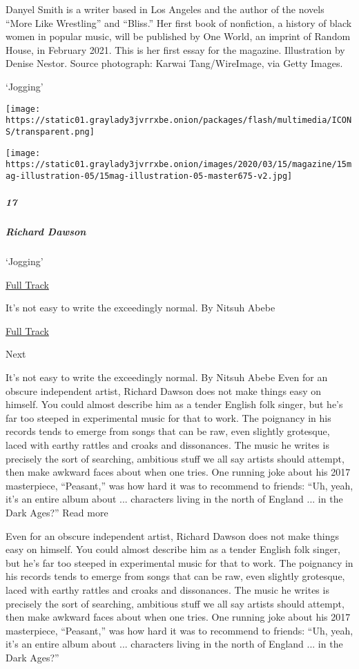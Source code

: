 Danyel Smith is a writer based in Los Angeles and the author of the
novels ``More Like Wrestling'' and ``Bliss.'' Her first book of
nonfiction, a history of black women in popular music, will be published
by One World, an imprint of Random House, in February 2021. This is her
first essay for the magazine. Illustration by Denise Nestor. Source
photograph: Karwai Tang/WireImage, via Getty Images.

`Jogging'

\texttt{[image: https://static01.graylady3jvrrxbe.onion/packages/flash/multimedia/ICONS/transparent.png]}

\texttt{[image: https://static01.graylady3jvrrxbe.onion/images/2020/03/15/magazine/15mag-illustration-05/15mag-illustration-05-master675-v2.jpg]}

\hypertarget{17}{%
\subparagraph{17}\label{17}}

\hypertarget{richard-dawson}{%
\subparagraph{Richard Dawson}\label{richard-dawson}}

`Jogging'

\href{https://open.spotify.com/track/3TYTZkdgqwkNIA94nKGt1B?si=NHCtjvYDRp6OOddx1ew7VA}{
Full Track}

It's not easy to write the exceedingly normal. By Nitsuh Abebe

\href{https://open.spotify.com/track/3TYTZkdgqwkNIA94nKGt1B?si=NHCtjvYDRp6OOddx1ew7VA}{Full
Track }

Next

It's not easy to write the exceedingly normal. By Nitsuh Abebe Even for
an obscure independent artist, Richard Dawson does not make things easy
on himself. You could almost describe him as a tender English folk
singer, but he's far too steeped in experimental music for that to work.
The poignancy in his records tends to emerge from songs that can be raw,
even slightly grotesque, laced with earthy rattles and croaks and
dissonances. The music he writes is precisely the sort of searching,
ambitious stuff we all say artists should attempt, then make awkward
faces about when one tries. One running joke about his 2017 masterpiece,
``Peasant,'' was how hard it was to recommend to friends: ``Uh, yeah,
it's an entire album about ... characters living in the north of England
... in the Dark Ages?'' Read more

Even for an obscure independent artist, Richard Dawson does not make
things easy on himself. You could almost describe him as a tender
English folk singer, but he's far too steeped in experimental music for
that to work. The poignancy in his records tends to emerge from songs
that can be raw, even slightly grotesque, laced with earthy rattles and
croaks and dissonances. The music he writes is precisely the sort of
searching, ambitious stuff we all say artists should attempt, then make
awkward faces about when one tries. One running joke about his 2017
masterpiece, ``Peasant,'' was how hard it was to recommend to friends:
``Uh, yeah, it's an entire album about ... characters living in the
north of England ... in the Dark Ages?''


